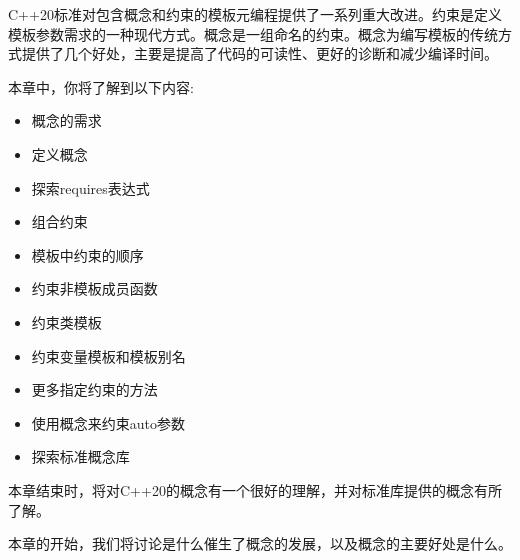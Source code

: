 C++20标准对包含概念和约束的模板元编程提供了一系列重大改进。约束是定义模板参数需求的一种现代方式。概念是一组命名的约束。概念为编写模板的传统方式提供了几个好处，主要是提高了代码的可读性、更好的诊断和减少编译时间。

本章中，你将了解到以下内容:

\begin{itemize}
\item
概念的需求

\item
定义概念

\item
探索requires表达式

\item
组合约束

\item
模板中约束的顺序

\item
约束非模板成员函数

\item
约束类模板

\item
约束变量模板和模板别名

\item
更多指定约束的方法

\item
使用概念来约束auto参数

\item
探索标准概念库
\end{itemize}

本章结束时，将对C++20的概念有一个很好的理解，并对标准库提供的概念有所了解。

本章的开始，我们将讨论是什么催生了概念的发展，以及概念的主要好处是什么。


























